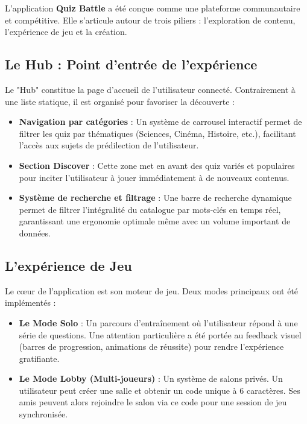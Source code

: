 \documentclass[12pt,a4paper]{article}
\begin{document}
L'application \textbf{Quiz Battle} a été conçue comme une plateforme communautaire et compétitive. Elle s'articule autour de trois piliers : l'exploration de contenu, l'expérience de jeu et la création.

\subsection{Le Hub : Point d'entrée de l'expérience}
Le "Hub" constitue la page d'accueil de l'utilisateur connecté. Contrairement à une liste statique, il est organisé pour favoriser la découverte :
\begin{itemize}
    \item \textbf{Navigation par catégories} : Un système de carrousel interactif permet de filtrer les quiz par thématiques (Sciences, Cinéma, Histoire, etc.), facilitant l'accès aux sujets de prédilection de l'utilisateur.
    \item \textbf{Section Discover} : Cette zone met en avant des quiz variés et populaires pour inciter l'utilisateur à jouer immédiatement à de nouveaux contenus.
    \item \textbf{Système de recherche et filtrage} : Une barre de recherche dynamique permet de filtrer l'intégralité du catalogue par mots-clés en temps réel, garantissant une ergonomie optimale même avec un volume important de données.
\end{itemize}

\subsection{L'expérience de Jeu}
Le cœur de l'application est son moteur de jeu. Deux modes principaux ont été implémentés :
\begin{itemize}
    \item \textbf{Le Mode Solo} : Un parcours d'entraînement où l'utilisateur répond à une série de questions. Une attention particulière a été portée au feedback visuel (barres de progression, animations de réussite) pour rendre l'expérience gratifiante.
    \item \textbf{Le Mode Lobby (Multi-joueurs)} : Un système de salons privés. Un utilisateur peut créer une salle et obtenir un code unique à 6 caractères. Ses amis peuvent alors rejoindre le salon via ce code pour une session de jeu synchronisée.
\end{itemize}
\end{document}
